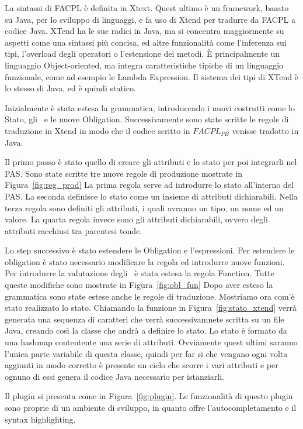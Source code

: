 La sintassi di \ac{FACPL} è definita in Xtext. Quest ultimo è un framework, basato su Java, per lo sviluppo di linguaggi, e fa uso di Xtend per tradurre da \ac{FACPL} a codice Java.
XTend ha le sue radici in Java, ma si concentra maggiormente su aspetti come una sintassi più concisa, ed altre funzionalità come l'inferenza sui tipi, l'overload degli operatori o l'estensione dei metodi. 
È principalmente un linguaggio Object-oriented, ma integra caratteristiche tipiche di un linguaggio funzionale, come ad esempio le Lambda Expression. Il sistema dei tipi di XTend è lo stesso di Java, ed è quindi statico.\par
Inizialmente è stata estesa la grammatica, introducendo i nuovi costrutti come lo Stato, gli \statusattribute \ e le nuove Obligation.
Successivamente sono state scritte le regole di traduzione in Xtend in modo che il codice scritto in $FACPL_{PB}$ venisse tradotto in Java.\par
Il primo passo è stato quello di creare gli attributi e lo stato per poi integrarli nel PAS.
Sono state scritte tre nuove regole di produzione mostrate in Figura~\ref{fig:reg_prod}
La prima regola serve ad introdurre lo stato all'interno del PAS.
La seconda definisce lo stato come un insieme di attributi dichiarabili.
Nella terza regola sono definiti gli attributi, i quali avranno un tipo, un nome ed un valore.
La quarta regola invece sono gli attributi dichiarabili, ovvero degli attributi racchiusi tra parentesi tonde.\par
Lo step successivo è stato estendere le Obligation e l'espressioni.
Per estendere le obligation è stato necessario modificare la regola ed introdurre nuove funzioni. Per introdurre la valutazione degli \statusattribute \ è stata estesa la regola Function. Tutte queste modifiche sono mostrate in Figura~\ref{fig:obl_fun}
Dopo aver esteso la grammatica sono state estese anche le regole di traduzione. Mostriamo ora com'è stato realizzato lo stato.
Chiamando la funzione in Figura~\ref{fig:stato_xtend} verrà generata una sequenza di caratteri che verrà successivamnete scritta su un file Java, creando così la classe che andrà a definire lo stato.
Lo stato è formato da una hashmap contentente una serie di attributi. Ovviamente quest ultimi saranno l'unica parte variabile di questa classe, quindi per far si che vengano ogni volta aggiunti in modo corretto è presente un ciclo che scorre i vari attributi e per ognuno di essi genera il codice Java necessario per istanziarli. \par
Il plugin si presenta come in Figura~\ref{fig:plugin}. Le funzionalità di questo plugin sono proprie di un ambiente di sviluppo, in quanto offre l'autocompletamento e il syntax highlighting. 



